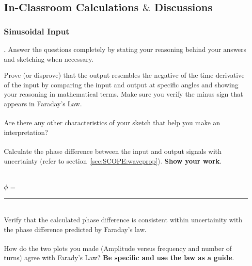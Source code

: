 \subsection{In-Classroom Calculations $\&$ Discussions}
\subsubsection{Sinusoidal Input}
. Answer the questions completely by  stating your 
reasoning
behind your answers and sketching when necessary. 

\noindent Prove (or disprove) that the output resembles the 
negative of the time derivative of 
the input by comparing the input and output at specific angles and 
showing your reasoning in mathematical terms. Make sure you verify the 
minus sign that appears in Faraday's Law. \\
\vspace*{7cm} \\
\noindent Are there any other characteristics of 
your sketch that help you make an interpretation? \\
\vspace*{3cm} \\

\vfill
\noindent Calculate the phase difference between the input and output 
signals with 
uncertainty (refer to section~\ref{sec:SCOPE:waveprop}). {\bf Show your work}.\\ 
\vspace*{4cm}\\
\hspace*{2cm} {$\phi$ =~\rule{3cm}{.1mm}}\\ 
\noindent Verify that the calculated phase difference is consistent 
within uncertainity with the phase difference predicted by 
Faraday's law. \\
\vspace*{2cm} \\
\noindent How do the two plots you made (Amplitude versus frequency and number
of turns) agree with Farady's Law?  {\bf Be specific and use the law as a guide}.

\vfill 
\pagebreak

